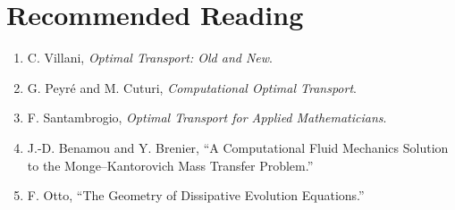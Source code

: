 \section*{Recommended Reading}
\begin{enumerate}
    \item C. Villani, \emph{Optimal Transport: Old and New}.
    \item G. Peyr\'e and M. Cuturi, \emph{Computational Optimal Transport}.
    \item F. Santambrogio, \emph{Optimal Transport for Applied Mathematicians}.
    \item J.-D. Benamou and Y. Brenier, ``A Computational Fluid Mechanics Solution to the Monge--Kantorovich Mass Transfer Problem.''
    \item F. Otto, ``The Geometry of Dissipative Evolution Equations.''
\end{enumerate}
